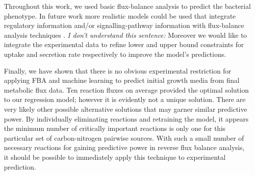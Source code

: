 \documentclass[12pt]{article}
\begin{document}
Throughout this work, we used basic flux-balance analysis to predict the bacterial phenotype. In future work more realistic models could be used that integrate regulatory information and/or signalling-pathway information with flux-balance analysis techniques \cite{CovertPalsson2002,Covertetal2008}. {\color{red}\emph{I don't understand this sentence:} Moreover we would like to integrate the experimental data \cite{Brandesetal2012} to refine lower and upper bound constraints for uptake and secretion rate respectively to improve the model's predictions.}

Finally, we have shown that there is no obvious experimental restriction for applying FBA and machine learning to predict initial growth media from final metabolic flux data. Ten reaction fluxes on average provided the optimal solution to our regression model; however it is evidently not a unique solution. There are very likely other possible alternative solutions that may garner similar predictive power. By individually eliminating reactions and retraining the model, it appears the minimum number of critically important reactions is only one for this particular set of carbon-nitrogen pairwise sources.  With such a small number of necessary reactions for gaining predictive power in reverse flux balance analysis, it should be possible to immediately apply this technique to experimental prediction. 

\end{document}
